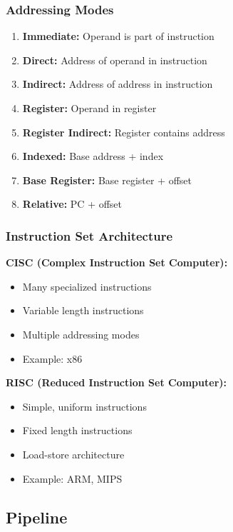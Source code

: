 \documentclass[11pt,a4paper]{article}
\begin{document}
\subsubsection{Addressing Modes}

\begin{enumerate}
    \item \textbf{Immediate:} Operand is part of instruction
    \item \textbf{Direct:} Address of operand in instruction
    \item \textbf{Indirect:} Address of address in instruction
    \item \textbf{Register:} Operand in register
    \item \textbf{Register Indirect:} Register contains address
    \item \textbf{Indexed:} Base address + index
    \item \textbf{Base Register:} Base register + offset
    \item \textbf{Relative:} PC + offset
\end{enumerate}

\subsubsection{Instruction Set Architecture}

\textbf{CISC (Complex Instruction Set Computer):}
\begin{itemize}
    \item Many specialized instructions
    \item Variable length instructions
    \item Multiple addressing modes
    \item Example: x86
\end{itemize}

\textbf{RISC (Reduced Instruction Set Computer):}
\begin{itemize}
    \item Simple, uniform instructions
    \item Fixed length instructions
    \item Load-store architecture
    \item Example: ARM, MIPS
\end{itemize}

\subsection{Pipeline}
\end{document}
